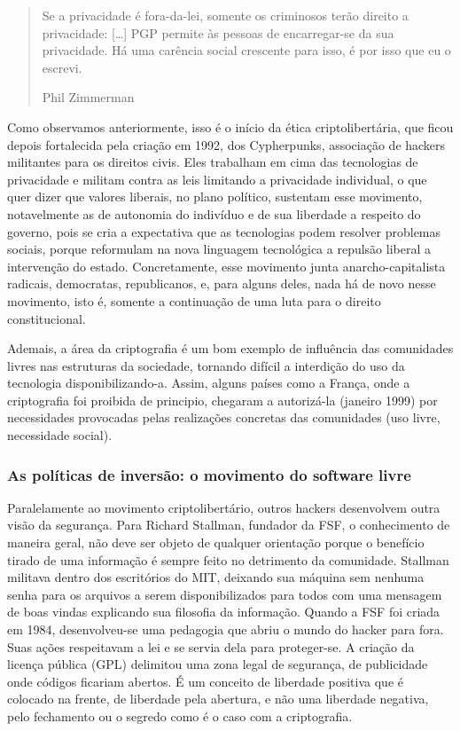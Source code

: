\begin{quote}
Se a privacidade é fora-da-lei, somente os criminosos terão direito a privacidade: […] PGP permite às pessoas de encarregar-se da sua privacidade. Há uma carência social crescente para isso, é por isso que eu o escrevi.
\begin{flushright}
Phil Zimmerman
\end{flushright}
\end{quote}

Como observamos anteriormente, isso é o início da ética criptolibertária, que ficou depois fortalecida pela criação em 1992, dos Cypherpunks, associação de hackers militantes para os direitos civis. Eles trabalham em cima das tecnologias de privacidade e militam contra as leis limitando a privacidade individual, o que quer dizer que valores liberais, no plano político, sustentam esse movimento, notavelmente as de autonomia do indivíduo e de sua liberdade a respeito do governo, pois se cria a expectativa que as tecnologias podem resolver problemas sociais, porque reformulam na nova linguagem tecnológica a repulsão liberal a intervenção do estado. Concretamente, esse movimento junta anarcho-capitalista radicais, democratas, republicanos, e, para alguns deles, nada há de novo nesse movimento, isto é, somente a continuação de uma luta para o direito constitucional.

Ademais, a área da criptografia é um bom exemplo de influência das comunidades livres nas estruturas da sociedade, tornando difícil a interdição do uso da tecnologia disponibilizando-a. Assim, alguns países como a França, onde a criptografia foi proibida de principio, chegaram a autorizá-la (janeiro 1999) por necessidades provocadas pelas realizações concretas das comunidades (uso livre, necessidade social).

\subsubsection{As políticas de inversão: o movimento do software livre} \label{2.2.2.c}

Paralelamente ao movimento criptolibertário, outros hackers desenvolvem outra visão da segurança. Para Richard Stallman, fundador da FSF, o conhecimento de maneira geral, não deve ser objeto de qualquer orientação porque o benefício tirado de uma informação é sempre feito no detrimento da comunidade. Stallman militava dentro dos escritórios do MIT, deixando sua máquina sem nenhuma senha para os arquivos a serem disponibilizados para todos com uma mensagem de boas vindas explicando sua filosofia da informação. Quando a FSF foi criada em 1984, desenvolveu-se uma pedagogia que abriu o mundo do hacker para fora. Suas ações respeitavam a lei e se servia dela para proteger-se. A criação da licença pública (GPL) delimitou uma zona legal de segurança, de publicidade onde códigos ficariam abertos. \'E um conceito de liberdade positiva que é colocado na frente, de liberdade pela abertura, e não uma liberdade negativa, pelo fechamento ou o segredo como é o caso com a criptografia.


